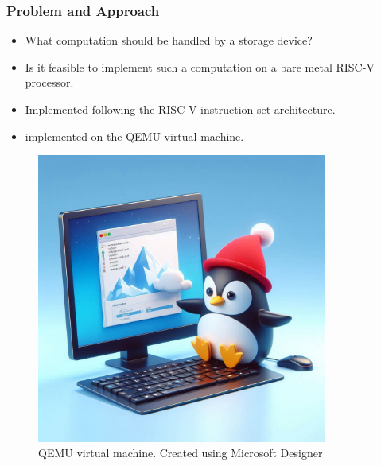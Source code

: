 \begin{frame}[hoved]
  \frametitle{Problem and Approach}
  \begin{minipage}{0.45\textwidth}
  \begin{itemize}
    \item What computation should be handled by a storage device?
    \item Is it feasible to implement such a computation on a bare metal RISC-V
      processor.
    \item Implemented following the RISC-V instruction set architecture.
    \item implemented on the QEMU virtual machine.
  \end{itemize}
\end{minipage}
\hfill
\begin{minipage}{0.45\textwidth}
  \begin{figure}
    \begin{center}
      \includegraphics[width=0.85\textwidth]{figures/qemuvirt.jpeg}
    \end{center}
    \caption{QEMU virtual machine. {\footnotesize Created using Microsoft
    Designer}}\label{fig:qemu}
  \end{figure}
\end{minipage}
\end{frame}

